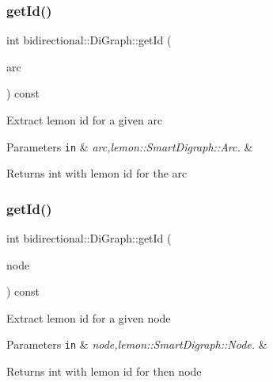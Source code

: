 \subsubsection{\texorpdfstring{get\+Id()}{getId()}\hspace{0.1cm}{\footnotesize\ttfamily [1/2]}}
{\footnotesize\ttfamily int bidirectional\+::\+Di\+Graph\+::get\+Id (\begin{DoxyParamCaption}\item[{const \hyperlink{digraph_8h_ae6cfd87753a14ebe6d11871314aff34d}{Lemon\+Arc} \&}]{arc }\end{DoxyParamCaption}) const\hspace{0.3cm}{\ttfamily [inline]}}

Extract lemon id for a given arc


\begin{DoxyParams}[1]{Parameters}
\mbox{\tt in}  & {\em arc,lemon\+::\+Smart\+Digraph\+::\+Arc.} & \\
\hline
\end{DoxyParams}
\begin{DoxyReturn}{Returns}
int with lemon id for the arc 
\end{DoxyReturn}
\mbox{\label{classbidirectional_1_1DiGraph_afb87bafec6ea1764bd19509f0b0ca4e9}} 
\subsubsection{\texorpdfstring{get\+Id()}{getId()}\hspace{0.1cm}{\footnotesize\ttfamily [2/2]}}
{\footnotesize\ttfamily int bidirectional\+::\+Di\+Graph\+::get\+Id (\begin{DoxyParamCaption}\item[{const \hyperlink{digraph_8h_a9e28ff6f29770c88642a42cab9f42fed}{Lemon\+Node} \&}]{node }\end{DoxyParamCaption}) const\hspace{0.3cm}{\ttfamily [inline]}}

Extract lemon id for a given node


\begin{DoxyParams}[1]{Parameters}
\mbox{\tt in}  & {\em node,lemon\+::\+Smart\+Digraph\+::\+Node.} & \\
\hline
\end{DoxyParams}
\begin{DoxyReturn}{Returns}
int with lemon id for then node 
\end{DoxyReturn}
\mbox{\label{classbidirectional_1_1DiGraph_a966eb000fda1f5dac268f8f4ae6b19cb}} 
